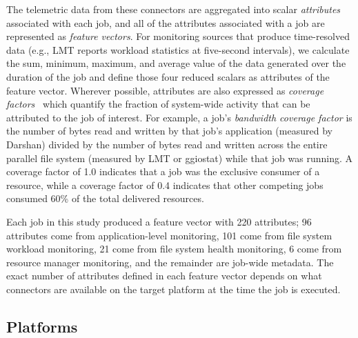 The telemetric data from these connectors are aggregated into scalar \emph{attributes} associated with each job, and all of the attributes associated with a job are represented as \emph{feature vectors}.
For monitoring sources that produce time-resolved data (e.g., LMT reports workload statistics at five-second intervals), we calculate the sum, minimum, maximum, and average value of the data generated over the duration of the job and define those four reduced scalars as attributes of the feature vector.
Wherever possible, attributes are also expressed as \emph{coverage factors}~\cite{Lockwood2017} which quantify the fraction of system-wide activity that can be attributed to the job of interest.
For example, a job's \emph{bandwidth coverage factor} is the number of bytes read and written by that job's application (measured by Darshan) divided by the number of bytes read and written across the entire parallel file system (measured by LMT or ggiostat) while that job was running.
A coverage factor of 1.0 indicates that a job was the exclusive consumer of
a resource, while a coverage factor of 0.4 indicates that other competing
jobs consumed 60\% of the total delivered resources.

Each job in this study produced a feature vector with 220 attributes; 96 attributes come from application-level monitoring, 101 come from file system workload monitoring, 21 come from file system health monitoring, 6 come from resource manager monitoring, and the remainder are job-wide metadata.
The exact number of attributes defined in each
feature vector depends on what connectors are available on the target platform at the time the job is executed.

\subsection{Platforms}\label{sec:methods/platforms}

